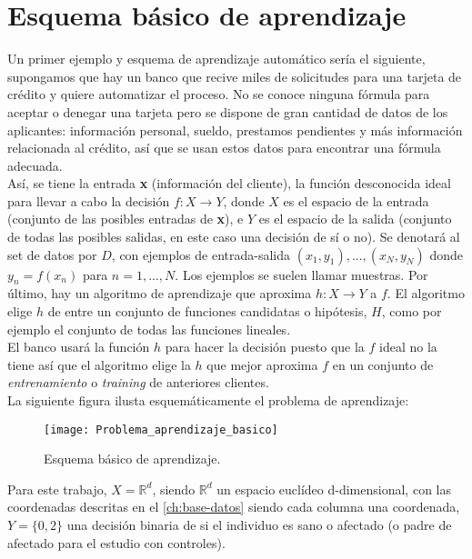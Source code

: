 \section{Esquema básico de aprendizaje}
Un primer ejemplo y esquema de aprendizaje automático sería el siguiente, supongamos que hay un banco que recive miles de solicitudes para una tarjeta de crédito y quiere automatizar el proceso. No se conoce ninguna fórmula para aceptar o denegar una tarjeta pero se dispone de gran cantidad de datos de los aplicantes: información personal, sueldo, prestamos pendientes y más información relacionada al crédito, así que se usan estos datos para encontrar una fórmula adecuada.\\
Así, se tiene la entrada \textbf{x} (información del cliente), la función desconocida ideal para llevar a cabo la decisión $f:X \rightarrow Y$, donde $X$ es el espacio de la entrada (conjunto de las posibles entradas de \textbf{x}), e $Y$ es el espacio de la salida (conjunto de todas las posibles salidas, en este caso una decisión de sí o no). Se denotará al set de datos por $D$, con ejemplos de entrada-salida $(x_{1},y_{1}),...,(x_{N},y_{N})$ donde $y_{n}=f(x_{n})$ para $n=1,...,N$. Los ejemplos se suelen llamar muestras. Por último, hay un algoritmo de aprendizaje que aproxima $h:X \rightarrow Y$ a $f$.  El algoritmo elige $h$ de entre un conjunto de funciones candidatas o hipótesis, $H$, como por ejemplo el conjunto de todas las funciones lineales.\\
El banco usará la función $h$ para hacer la decisión puesto que la $f$ ideal no la tiene así que el algoritmo elige la $h$ que mejor aproxima $f$ en un conjunto de \textit{entrenamiento} o \textit{training} de anteriores clientes. \cite{abu2012learning}\\
La siguiente figura ilusta esquemáticamente el problema de aprendizaje:
\begin{figure}[H]
  \centering
  \texttt{[image: Problema\_aprendizaje\_basico]}
  \caption{Esquema básico de aprendizaje. \cite{abu2012learning}}
  \label{fig:k-nn-example}
\end{figure}

Para este trabajo, $X=\mathbb{R}^{d}$, siendo $\mathbb{R}^{d}$ un espacio euclídeo d-dimensional, con las coordenadas descritas en el \autoref{ch:base-datos} siendo cada columna una coordenada, $Y=\lbrace 0,2 \rbrace$ una decisión binaria de si el individuo es sano o afectado (o padre de afectado para el estudio con controles).\\
